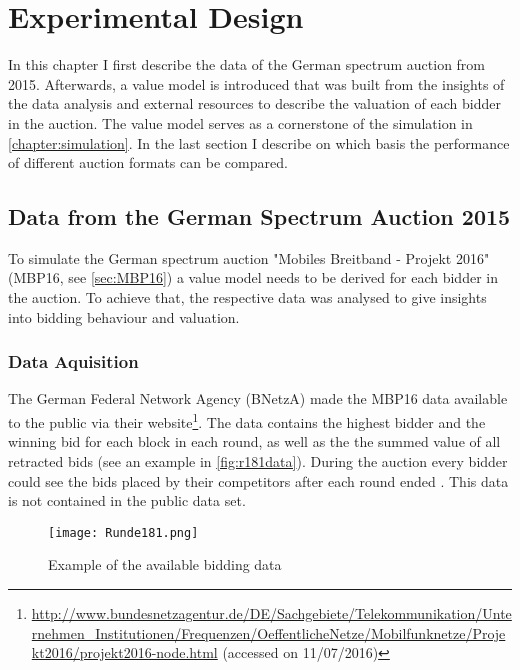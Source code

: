 \graphicspath{{./figures/ch3/}}

\chapter{Experimental Design}\label{chapter:experiment}
In this chapter I first describe the data of the German spectrum auction from 2015. Afterwards, a value model is introduced that was built from the insights of the data analysis and external resources to describe the valuation of each bidder in the auction. The value model serves as a cornerstone of the simulation in \autoref{chapter:simulation}. In the last section I describe on which basis the performance of different auction formats can be compared.

\section{Data from the German Spectrum Auction 2015}
To simulate the German spectrum auction "Mobiles Breitband - Projekt 2016" (MBP16, see \autoref{sec:MBP16}) a value model needs to be derived for each bidder in the auction. To achieve that, the respective data was analysed to give insights into bidding behaviour and valuation.

\subsection{Data Aquisition}
The German Federal Network Agency (BNetzA) made the MBP16 data available to the public via their website\footnote{\url{http://www.bundesnetzagentur.de/DE/Sachgebiete/Telekommunikation/Unternehmen_Institutionen/Frequenzen/OeffentlicheNetze/Mobilfunknetze/Projekt2016/projekt2016-node.html} (accessed on 11/07/2016)}.
The data contains the highest bidder and the winning bid for each block in each round, as well as the the summed value of all retracted bids (see an example in \autoref{fig:r181data}). During the auction every bidder could see the bids placed by their competitors after each round ended \cite{Bundesnetzagentur2015}. This data is not contained in the public data set.

\begin{figure}[h]
\centering
\texttt{[image: Runde181.png]}
\caption{Example of the available bidding data} \label{fig:r181data}
\end{figure}

